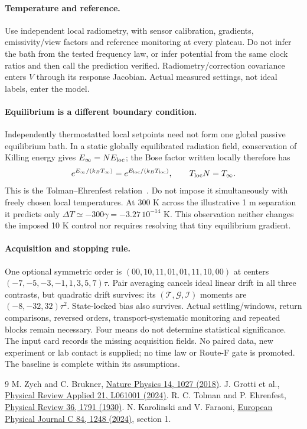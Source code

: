 \documentclass[11pt,a4paper]{article}
\begin{document}
\paragraph{Temperature and reference.}
Use independent local radiometry, with sensor calibration, gradients,
emissivity/view factors and reference monitoring at every plateau.
Do not infer the bath from the tested frequency law, or infer potential
from the same clock ratios and then call the prediction verified.
Radiometry/correction covariance enters $V$ through its response
Jacobian. Actual measured settings, not ideal labels, enter the model.

\paragraph{Equilibrium is a different boundary condition.}
Independently thermostatted local setpoints need not form one global
passive equilibrium bath. In a static globally equilibrated radiation
field, conservation of Killing energy gives $E_\infty=NE_{\rm loc}$;
the Bose factor written locally therefore has
\begin{equation}
 e^{E_\infty/(k_BT_\infty)}
 =e^{E_{\rm loc}/(k_BT_{\rm loc})},\qquad
 T_{\rm loc}N=T_\infty .
\end{equation}
This is the Tolman--Ehrenfest relation~\cite{tolman,thermal}.
Do not impose it simultaneously with freely chosen local temperatures.
At 300 K across the illustrative 1 m separation it predicts only
$\Delta T\simeq-300\gamma=-3.27\,10^{-14}$ K.
This observation neither changes the imposed 10 K control nor requires
resolving that tiny equilibrium gradient.

\paragraph{Acquisition and stopping rule.}
One optional symmetric order is $(00,10,11,01,01,11,10,00)$ at
centers $(-7,-5,-3,-1,1,3,5,7)\tau$. Pair averaging cancels ideal
linear drift in all three contrasts, but quadratic drift survives:
its $(\mathcal T,\mathcal G,\mathcal I)$ moments are
$(-8,-32,32)\tau^2$. State-locked bias also survives.
Actual settling/windows, return comparisons, reversed orders,
transport-systematic monitoring and repeated blocks remain necessary.
Four means do not determine statistical significance.
The input card records the missing acquisition fields. No paired data,
new experiment or lab contact is supplied; no time law or Route-F gate
is promoted. The baseline is complete within its assumptions.

\begin{thebibliography}{9}\small
{} M. Zych and C. Brukner,
\href{https://doi.org/10.1038/s41567-018-0197-6}{Nature Physics 14, 1027 (2018)}.
 J. Grotti et al.,
\href{https://doi.org/10.1103/PhysRevApplied.21.L061001}{Physical Review Applied 21, L061001 (2024)}.
 R. C. Tolman and P. Ehrenfest,
\href{https://doi.org/10.1103/PhysRev.36.1791}{Physical Review 36, 1791 (1930)}.
 N. Karolinski and V. Faraoni,
\href{https://doi.org/10.1140/epjc/s10052-024-13632-6}{European Physical Journal C 84, 1248 (2024)}, section 1.
\end{thebibliography}
\end{document}
